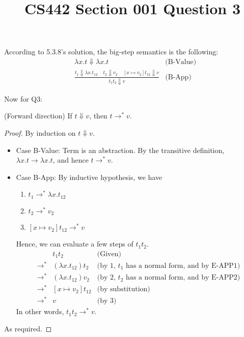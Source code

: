 \documentclass[12pt]{article}
\title{CS442 Section 001 Question 3}
\begin{document}
\maketitle

According to 5.3.8's solution, the big-step semantics is the following:
\begin{align*}
& \lambda x . t \Downarrow \lambda x . t & \text{(B-Value)} \\
& \frac{t_1 \Downarrow \lambda x . t_{12} \;\;\;\; t_2 \Downarrow v_2 \;\;\;\; [x \mapsto v_2] t_{12} \Downarrow v} {t_1t_2 \Downarrow v} & \text{(B-App)}
\end{align*}

Now for Q3:
\begin{claim}
(Forward direction) If $t \Downarrow v$, then $t \rightarrow^* v$.
\end{claim}
\begin{proof}
By induction on $t \Downarrow v$.
\begin{itemize}
\item
Case B-Value:
Term is an abstraction.
By the transitive definition, $\lambda x . t \rightarrow \lambda x . t$, and hence $t \rightarrow^* v$.
\item
Case B-App: 
By inductive hypothesis, we have
\begin{enumerate}
\item
$t_1 \rightarrow^* \lambda x . t_{12}$
\item
$t_2 \rightarrow^* v_2$
\item
$[x \mapsto v_2] t_{12} \rightarrow^* v$
\end{enumerate}
Hence, we can evaluate a few steps of $t_1t_2$.
\begin{align*}
& t_1t_2 & \text{(Given)} \\
\rightarrow^* & (\lambda x . t_{12}) t_2 & \text{(by 1, $t_1$ has a normal form, and by E-APP1)} \\
\rightarrow^* & (\lambda x . t_{12}) v_2 & \text{(by 2, $t_2$ has a normal form, and by E-APP2)} \\
\rightarrow^* & [x \mapsto v_2] t_{12} & \text{(by substitution)} \\
\rightarrow^* & v & \text{(by 3)}
\end{align*}
In other words, $t_1t_2 \rightarrow^* v$.
\end{itemize}
As required.
\end{proof}
\end{document}
